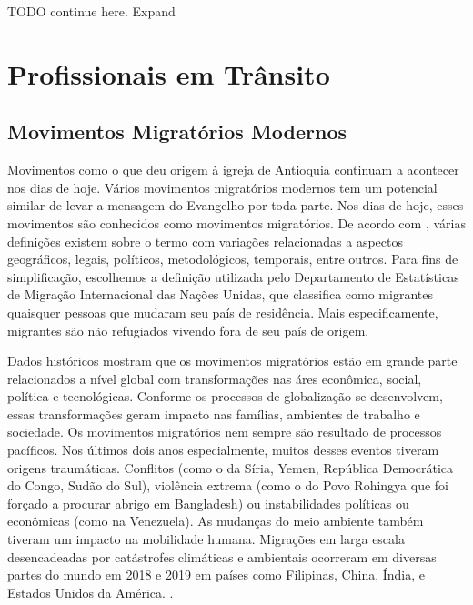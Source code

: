 \documentclass[
	12pt,				%
	openright,			%
	twoside,			%
	a4paper,			%
	english,			%
	french,				%
	spanish,			%
	brazil				%
	]{abntex2}
\begin{document}
TODO continue here. Expand

\chapter{Profissionais em Trânsito}

\section {Movimentos Migratórios Modernos}

Movimentos como o que deu origem à igreja de Antioquia continuam a acontecer nos dias de hoje. Vários movimentos migratórios modernos tem um potencial similar de levar a mensagem do Evangelho por toda parte. Nos dias de hoje, esses movimentos são conhecidos como movimentos migratórios. De acordo com \cite{iom2020}, várias definições existem sobre o termo com variações relacionadas a aspectos geográficos, legais, políticos, metodológicos, temporais, entre outros. Para fins de simplificação, escolhemos a definição utilizada pelo Departamento de Estatísticas de Migração Internacional das Nações Unidas, que classifica como migrantes quaisquer pessoas que mudaram seu país de residência. Mais especificamente, migrantes são não refugiados vivendo fora de seu país de origem. 

Dados históricos mostram que os movimentos migratórios estão em grande parte relacionados a nível global com transformações nas áres econômica, social, política e tecnológicas. Conforme os processos de globalização se desenvolvem, essas transformações geram impacto nas famílias, ambientes de trabalho e sociedade. Os movimentos migratórios nem sempre são resultado de processos pacíficos. Nos últimos dois anos especialmente, muitos desses eventos tiveram origens traumáticas. Conflitos (como o da Síria, Yemen, República Democrática do Congo, Sudão do Sul), violência extrema (como o do Povo Rohingya que foi forçado a procurar abrigo em Bangladesh) ou instabilidades políticas ou econômicas (como na Venezuela). As mudanças do meio ambiente também tiveram um impacto na mobilidade humana. Migrações em larga escala desencadeadas por catástrofes climáticas e ambientais ocorreram em diversas partes do mundo em 2018 e 2019 em países como Filipinas, China, Índia, e Estados Unidos da América. \cite[19]{iom2020}.
\end{document}
